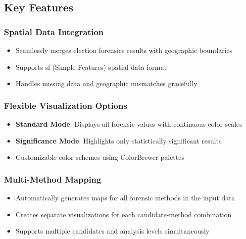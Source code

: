 \documentclass{article}
\begin{document}
\subsection{Key Features}

\subsubsection{Spatial Data Integration}
\begin{itemize}
    \item Seamlessly merges election forensics results with geographic boundaries
    \item Supports sf (Simple Features) spatial data format
    \item Handles missing data and geographic mismatches gracefully
\end{itemize}

\subsubsection{Flexible Visualization Options}
\begin{itemize}
    \item \textbf{Standard Mode}: Displays all forensic values with continuous color scales
    \item \textbf{Significance Mode}: Highlights only statistically significant results
    \item Customizable color schemes using ColorBrewer palettes
\end{itemize}

\subsubsection{Multi-Method Mapping}
\begin{itemize}
    \item Automatically generates maps for all forensic methods in the input data
    \item Creates separate visualizations for each candidate-method combination
    \item Supports multiple candidates and analysis levels simultaneously
\end{itemize}
\end{document}
